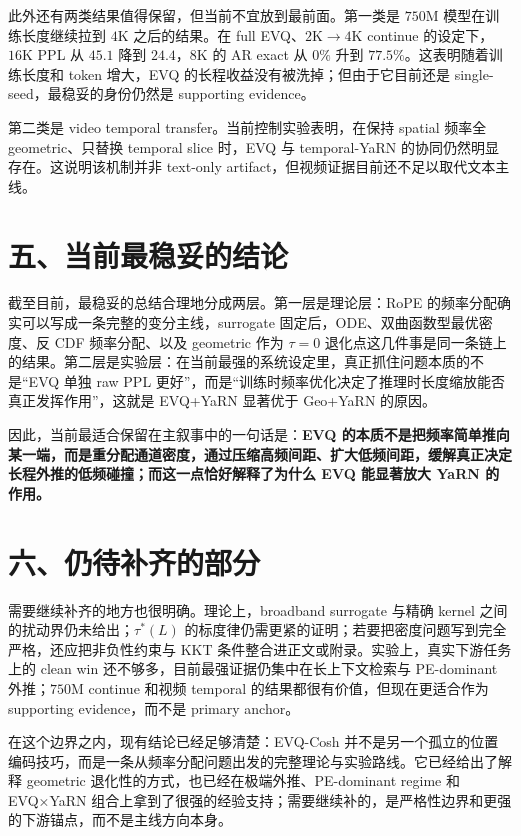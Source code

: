 \documentclass[11pt]{article}
\begin{document}
此外还有两类结果值得保留，但当前不宜放到最前面。第一类是 \(750\mathrm M\) 模型在训练长度继续拉到 \(4\mathrm K\) 之后的结果。在 full EVQ、\(2\mathrm K\to4\mathrm K\) continue 的设定下，\(16\mathrm K\) PPL 从 \(45.1\) 降到 \(24.4\)，\(8\mathrm K\) 的 AR exact 从 \(0\%\) 升到 \(77.5\%\)。这表明随着训练长度和 token 增大，EVQ 的长程收益没有被洗掉；但由于它目前还是 single-seed，最稳妥的身份仍然是 supporting evidence。

第二类是 video temporal transfer。当前控制实验表明，在保持 spatial 频率全 geometric、只替换 temporal slice 时，EVQ 与 temporal-YaRN 的协同仍然明显存在。这说明该机制并非 text-only artifact，但视频证据目前还不足以取代文本主线。

\section*{五、当前最稳妥的结论}

截至目前，最稳妥的总结合理地分成两层。第一层是理论层：RoPE 的频率分配确实可以写成一条完整的变分主线，surrogate 固定后，ODE、双曲函数型最优密度、反 CDF 频率分配、以及 geometric 作为 \(\tau=0\) 退化点这几件事是同一条链上的结果。第二层是实验层：在当前最强的系统设定里，真正抓住问题本质的不是“EVQ 单独 raw PPL 更好”，而是“训练时频率优化决定了推理时长度缩放能否真正发挥作用”，这就是 EVQ+YaRN 显著优于 Geo+YaRN 的原因。

因此，当前最适合保留在主叙事中的一句话是：\textbf{EVQ 的本质不是把频率简单推向某一端，而是重分配通道密度，通过压缩高频间距、扩大低频间距，缓解真正决定长程外推的低频碰撞；而这一点恰好解释了为什么 EVQ 能显著放大 YaRN 的作用。}

\section*{六、仍待补齐的部分}

需要继续补齐的地方也很明确。理论上，broadband surrogate 与精确 kernel 之间的扰动界仍未给出；\(\tau^*(L)\) 的标度律仍需更紧的证明；若要把密度问题写到完全严格，还应把非负性约束与 KKT 条件整合进正文或附录。实验上，真实下游任务上的 clean win 还不够多，目前最强证据仍集中在长上下文检索与 PE-dominant 外推；\(750\mathrm M\) continue 和视频 temporal 的结果都很有价值，但现在更适合作为 supporting evidence，而不是 primary anchor。

在这个边界之内，现有结论已经足够清楚：EVQ-Cosh 并不是另一个孤立的位置编码技巧，而是一条从频率分配问题出发的完整理论与实验路线。它已经给出了解释 geometric 退化性的方式，也已经在极端外推、PE-dominant regime 和 EVQ×YaRN 组合上拿到了很强的经验支持；需要继续补的，是严格性边界和更强的下游锚点，而不是主线方向本身。
\end{document}
